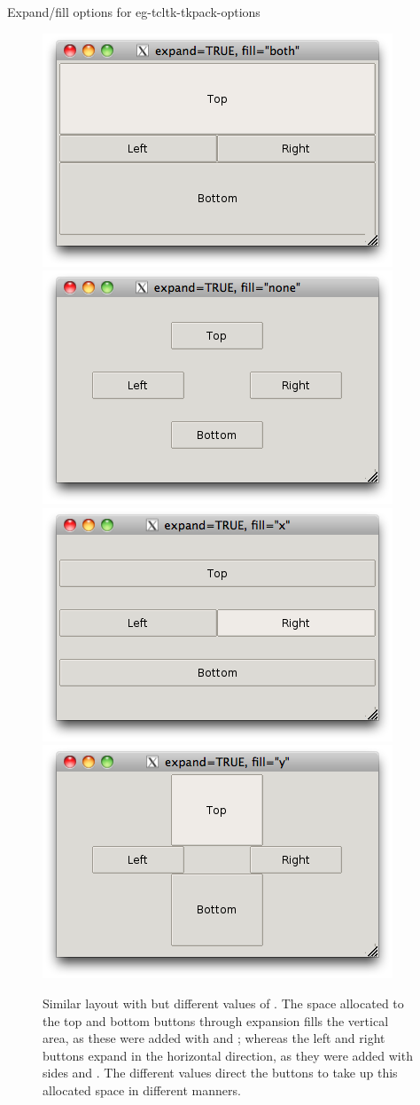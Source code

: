 \begin{example}{Expand/fill options for }{eg-tcltk-tkpack-options}
%
\begin{figure}
  \centering
\includegraphics[width=.4\textwidth]{fig-tcltk-expand-fill-both.png}
\includegraphics[width=.4\textwidth]{fig-tcltk-expand-fill-none.png}\\
\includegraphics[width=.4\textwidth]{fig-tcltk-expand-fill-x.png}
\includegraphics[width=.4\textwidth]{fig-tcltk-expand-fill-y.png}
 \caption{Similar layout with  but different values
   of . The space allocated to the  top and bottom buttons
   through expansion fills the vertical area, as these were added with
    and ; whereas the left and
   right buttons expand in the horizontal direction, as they were
   added with sides  and . The different
    values direct the buttons to take up this allocated
   space in different manners.}
 \label{fig:tcltk-expand-fill-arguments}
\end{figure}



\end{example}
